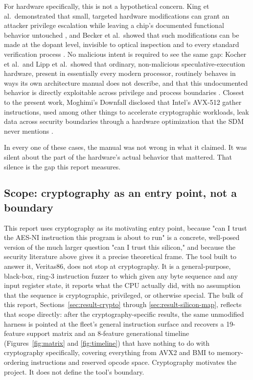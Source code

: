 \documentclass[11pt]{article}
\newcommand{\project}{Veritas86}
\begin{document}
For hardware specifically, this is not a hypothetical concern. King et
al.\ demonstrated that small, targeted hardware modifications can grant
an attacker privilege escalation while leaving a chip's documented
functional behavior untouched \cite{king2008}, and Becker et al.\ showed
that such modifications can be made at the dopant level, invisible to
optical inspection and to every standard verification process
\cite{becker2013}. No malicious intent is required to see the same gap:
Kocher et al.\ and Lipp et al.\ showed that ordinary, non-malicious
speculative-execution hardware, present in essentially every modern
processor, routinely behaves in ways its own architecture manual does
not describe, and that this undocumented behavior is directly
exploitable across privilege and process boundaries
\cite{kocher2019spectre, lipp2018meltdown}. Closest to the present work,
Moghimi's Downfall disclosed that Intel's AVX-512 gather instructions,
used among other things to accelerate cryptographic workloads, leak data
across security boundaries through a hardware optimization that the SDM
never mentions \cite{moghimi2023downfall}.

In every one of these cases, the manual was not wrong in what it
claimed. It was silent about the part of the hardware's actual behavior
that mattered. That silence is the gap this report measures.

\subsection{Scope: cryptography as an entry point, not a boundary}
\label{sec:scope}

This report uses cryptography as its motivating entry point, because
"can I trust the AES-NI instruction this program is about to run" is a
concrete, well-posed version of the much larger question "can I trust
this silicon," and because the security literature above gives it a
precise theoretical frame. The tool built to answer it, \project{}, does
not stop at cryptography. It is a general-purpose, black-box, ring-3
instruction fuzzer to which given any byte sequence and any input register state,
it reports what the CPU actually did, with no assumption that the
sequence is cryptographic, privileged, or otherwise special. The bulk of
this report, Sections~\ref{sec:result-crypto} through
\ref{sec:result-silicon-map}, reflects that scope directly: after the
cryptography-specific results, the same unmodified harness is pointed at
the fleet's general instruction surface and recovers a 19-feature support
matrix and an 8-feature generational timeline (Figures~\ref{fig:matrix}
and \ref{fig:timeline}) that have nothing to do with cryptography
specifically, covering everything from AVX2 and BMI to memory-ordering
instructions and reserved opcode space. Cryptography motivates the
project. It does not define the tool's boundary.
\end{document}

